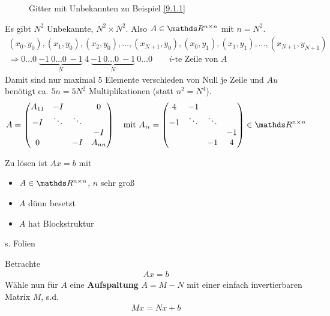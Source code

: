 \begin{Bspe}
\begin{figure}
\begin{image}{Gitter mit Unbekannten zu Beispiel \ref{9.1.1}}
\end{image}
\end{figure}
Es gibt $N^2$ Unbekannte, $N^2\times N^2$.
Also $A\in\R^{n\times n}$ mit $n=N^2$.
\begin{gather*}
  (x_0,y_0),(x_1,y_0),(x_2,y_0),
  \ldots,(x_{N+1},y_0),(x_0,y_1),(x_1,y_1),
  \ldots,(x_{N+1},y_{N+1})\\
  \Rightarrow 0\ldots0~\underbrace{-1~0\ldots0~-1}_{N}~4~
  \underbrace{-1~0\ldots0~-1}_{N}~0\ldots0
  \qquad \text{$i$-te Zeile von $A$}
\end{gather*}
Damit sind nur maximal 5 Elemente verschieden von Null je Zeile
und $Au$ benötigt ca. $5n=5N^2$ Multiplikationen (statt $n^2=N^4$).
\begin{gather}
  A=
  \begin{pmatrix}
    A_{11}&-I&&0\\
    -I &\ddots &\ddots \\
    && &-I\\
    0&&-I&A_{nn}    
  \end{pmatrix}
  \quad \text{mit }
  A_{ii}=\begin{pmatrix}
    4&-1\\
    -1&\ddots&\ddots\\
    &&&-1\\
    &&-1&4
  \end{pmatrix}\in\R^{n\times n}
\label{IX.1.2}
\end{gather}
\end{Bspe}

Zu lösen ist $Ax=b$ mit
\begin{itemize}
\item $A\in\R^{n\times n}$, $n$ sehr groß
\item $A$ dünn besetzt
\item $A$ hat Blockstruktur
\end{itemize}
s. Folien

Betrachte
\begin{gather}
  Ax=b
\label{IX.2.1}
\end{gather}
Wähle nun für $A$ eine \textbf{Aufspaltung} $A=M-N$
mit einer einfach invertierbaren Matrix $M$, s.d.
\begin{gather}
  Mx = Nx +b \label{IX.2.2}
\end{gather}

